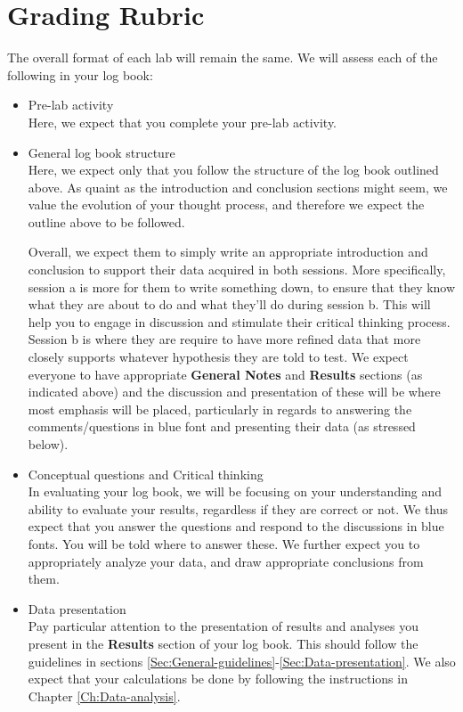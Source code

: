 \documentclass[12pt]{report}
\begin{document}
\section{Grading Rubric}
The overall format of each lab will remain the same. We will assess each of the following in your log book:

\begin{itemize}   
\item Pre-lab activity \\
Here, we expect that you complete your pre-lab activity.

\item General log book structure \\
Here, we expect only that you follow the structure of the log book outlined above. As quaint as the introduction and conclusion sections might seem, we value the evolution of your thought process, and therefore we expect the outline above to be followed.

\begin{tcolorbox}
Overall, we expect them to simply write an appropriate introduction  and conclusion to support their data acquired in both sessions. More specifically, session a is more for them to write something down, to ensure that they know what they are about to do and what they'll do during session b. 
This will help you to engage in discussion and stimulate their critical thinking process. Session b is where they are require to have more refined data that more closely supports whatever hypothesis they are told to test.
We expect everyone to have appropriate \textbf{General Notes} and \textbf{Results} sections  (as indicated above) and the discussion and presentation of these will be where most emphasis will be placed, particularly in regards to answering the comments/questions in blue font and presenting their data (as stressed below).
\end{tcolorbox}

\item Conceptual questions and Critical thinking \\
In evaluating your log book, we will be focusing on your understanding and ability to evaluate your results, regardless if they are correct or not. {\color{blue} We thus expect that you answer the questions and respond to the discussions in blue fonts. You will be told where to answer these.}
We further expect you to appropriately analyze your data, and  draw appropriate conclusions from them.

\item Data presentation \\
Pay particular attention to the presentation of results and analyses you present in the \textbf{Results} section of your log book. This should follow the guidelines in sections \ref{Sec:General-guidelines}-\ref{Sec:Data-presentation}. We also expect that your calculations be done  by following the instructions in Chapter \ref{Ch:Data-analysis}.


\end{itemize}
\end{document}
